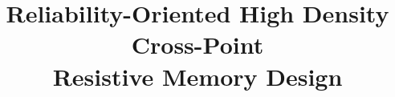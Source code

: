 \documentclass[9pt,conference,twocolumn]{IEEEtran}
\begin{document}
\title{\vspace{-10pt} Reliability-Oriented High Density Cross-Point \\Resistive Memory Design}
\maketitle


%



%
%


\begin{scriptsize}


\end{scriptsize}
\end{document}
